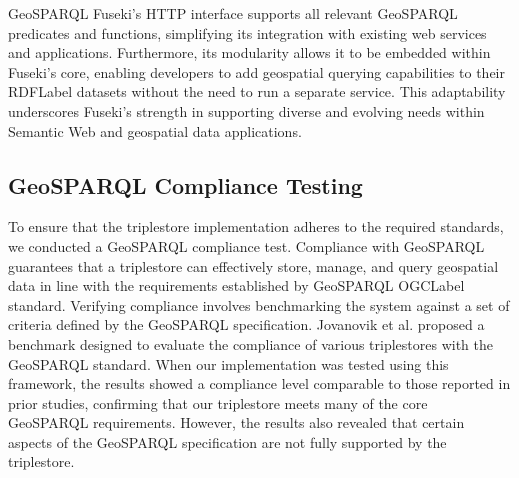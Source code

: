 GeoSPARQL Fuseki’s HTTP interface supports all relevant GeoSPARQL predicates and functions, simplifying its integration with existing web services and applications. Furthermore, its modularity allows it to be embedded within Fuseki’s core, enabling developers to add geospatial querying capabilities to their \acrshort{RDFLabel} datasets without the need to run a separate service. This adaptability underscores Fuseki's strength in supporting diverse and evolving needs within Semantic Web and geospatial data applications.

\subsection{GeoSPARQL Compliance Testing}\label{VI-subsec:compliance-geosparql}

To ensure that the triplestore implementation adheres to the required standards, we conducted a GeoSPARQL compliance test. Compliance with GeoSPARQL guarantees that a triplestore can effectively store, manage, and query geospatial data in line with the requirements established by GeoSPARQL \acrshort{OGCLabel} standard\cite{GeoSPARQLGeographicQuerya}. Verifying compliance involves benchmarking the system against a set of criteria defined by the GeoSPARQL specification. Jovanovik et al. \cite{jovanovikGeoSPARQLComplianceBenchmark2021a} proposed a benchmark designed to evaluate the compliance of various triplestores with the GeoSPARQL standard. When our implementation was tested using this framework, the results showed a compliance level comparable to those reported in prior studies, confirming that our triplestore meets many of the core GeoSPARQL requirements. However, the results also revealed that certain aspects of the GeoSPARQL specification are not fully supported by the triplestore.

